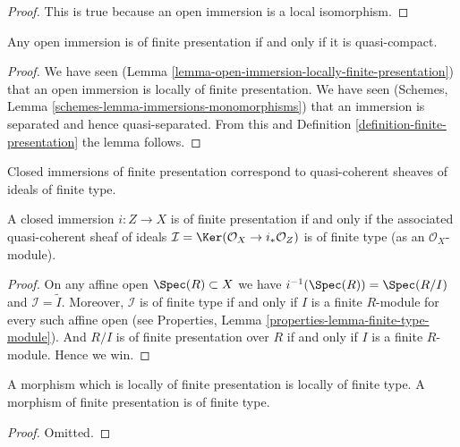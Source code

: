 \begin{proof}
This is true because an open immersion is a local isomorphism.
\end{proof}

\begin{lemma}
\label{lemma-quasi-compact-open-immersion-finite-presentation}
Any open immersion is of finite presentation if and only if
it is quasi-compact.
\end{lemma}

\begin{proof}
We have seen (Lemma \ref{lemma-open-immersion-locally-finite-presentation})
that an open immersion is locally of finite presentation.
We have seen (Schemes, Lemma \ref{schemes-lemma-immersions-monomorphisms})
that an immersion is separated and hence quasi-separated. From this
and Definition \ref{definition-finite-presentation} the lemma follows.
\end{proof}

\begin{lemma}
\label{lemma-closed-immersion-finite-presentation}
\begin{slogan}
Closed immersions of finite presentation correspond
to quasi-coherent sheaves of ideals of finite type.
\end{slogan}
A closed immersion $i : Z \to X$ is of finite presentation if and only if
the associated quasi-coherent sheaf of ideals
$\mathcal{I} = \Ker(\mathcal{O}_X \to i_*\mathcal{O}_Z)$
is of finite type (as an $\mathcal{O}_X$-module).
\end{lemma}

\begin{proof}
On any affine open $\Spec(R) \subset X$ we have
$i^{-1}(\Spec(R)) = \Spec(R/I)$ and
$\mathcal{I} = \widetilde{I}$. Moreover, $\mathcal{I}$
is of finite type if and only if $I$ is a finite $R$-module
for every such affine open (see
Properties, Lemma \ref{properties-lemma-finite-type-module}).
And $R/I$ is of finite presentation
over $R$ if and only if $I$ is a finite $R$-module. Hence we win.
\end{proof}

\begin{lemma}
\label{lemma-finite-presentation-finite-type}
A morphism which is locally of finite presentation is locally of finite type.
A morphism of finite presentation is of finite type.
\end{lemma}

\begin{proof}
Omitted.
\end{proof}

